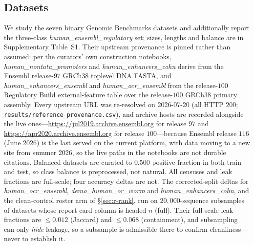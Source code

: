 \documentclass[webpdf,modern,large,namedate]{oup-authoring-template}%
\begin{document}
\subsection{Datasets}\label{sec:m-data}
We study the seven binary Genomic Benchmarks datasets \citep{gresova2023} and additionally report the three-class \textit{human\_ensembl\_regulatory} set; sizes, lengths and balance are in Supplementary Table~S1. Their upstream provenance is pinned rather than assumed: per the curators' own construction notebooks, \textit{human\_nontata\_promoters} and \textit{human\_enhancers\_cohn} derive from the Ensembl release-$97$ GRCh38 toplevel DNA FASTA, and \textit{human\_enhancers\_ensembl} and \textit{human\_ocr\_ensembl} from the release-$100$ Regulatory Build external-feature table over the release-$100$ GRCh38 primary assembly. Every upstream URL was re-resolved on 2026-07-20 (all HTTP $200$; \texttt{results/reference\_provenance.csv}), and archive hosts are recorded alongside the live ones---\url{https://jul2019.archive.ensembl.org} for release $97$ and \url{https://apr2020.archive.ensembl.org} for release $100$---because Ensembl release $116$ (June 2026) is the last served on the current platform, with data moving to a new site from summer 2026, so the live paths in the notebooks are not durable citations. Balanced datasets are curated to $0.500$ positive fraction in both train and test, so class balance is preprocessed, not natural. All censuses and leak fractions are full-scale; four accuracy deltas are not. The corrected-split deltas for \textit{human\_ocr\_ensembl}, \textit{demo\_human\_or\_worm} and \textit{human\_enhancers\_cohn}, and the clean-control roster arm of \S\ref{sec:r-rank}, run on $20{,}000$-sequence subsamples of datasets whose report-card column is headed $n$ (full). Their full-scale leak fractions are $\le0.012$ (Jaccard) and $\le0.068$ (containment), and subsampling can only \emph{hide} leakage, so a subsample is admissible there to confirm cleanliness---never to establish it.
\end{document}
